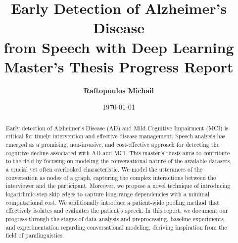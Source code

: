 \documentclass[10pt]{article}
\title{\textbf{Early Detection of Alzheimer's Disease \\ from Speech with Deep Learning \\}
\Large Master's Thesis Progress Report}
\date{\today}
\author{\textbf{Raftopoulos Michail}}
\affil{National Technical University of Athens, Greece}
\begin{document}
\maketitle

\begin{abstract} 
	Early detection of Alzheimer's Disease (AD) and Mild Cognitive
	Impairment (MCI) is critical for timely intervention and effective
	disease management. Speech analysis has emerged as a promising,
	non-invasive, and cost-effective approach for detecting the cognitive
	decline associated with AD and MCI. This master's thesis aims to contribute
	to the field by focusing on modeling the conversational nature of
	the available datasets, a crucial yet often overlooked characteristic. We
	model the utterances of the conversation as nodes of a graph, capturing the
	complex interactions between the interviewer and the participant. Moreover,
	we propose a novel technique of introducing logarithmic-step skip edges to
	capture long-range dependencies with a minimal computational cost. We additionally
	introduce a patient-wide pooling method that effectively isolates and
	evaluates the patient's speech. In this report, we document our progress
	through the stages of data analysis and preprocessing, baseline experiments
	and experimentation regarding conversational modeling, deriving inspiration
	from the field of paralinguistics.
\end{abstract}
\end{document}
